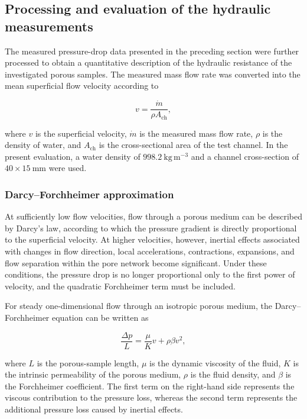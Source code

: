 \documentclass[a4paper]{article}
\begin{document}
\subsection{Processing and evaluation of the hydraulic measurements}
\label{sec:hydraulic_data_processing}

The measured pressure-drop data presented in the preceding section were further processed to obtain a quantitative description of the hydraulic resistance of the investigated porous samples. The measured mass flow rate was converted into the mean superficial flow velocity according to

\begin{equation}
    v = \frac{\dot{m}}{\rho A_{\mathrm{ch}}},
    \label{eq:superficial_velocity}
\end{equation}

where \(v\) is the superficial velocity, \(\dot{m}\) is the measured mass flow rate, \(\rho\) is the density of water, and \(A_{\mathrm{ch}}\) is the cross-sectional area of the test channel. In the present evaluation, a water density of \(998.2~\mathrm{kg\,m^{-3}}\) and a channel cross-section of \(40 \times 15~\mathrm{mm}\) were used.

\subsubsection{Darcy--Forchheimer approximation}
\label{subsec:darcy_forchheimer_approximation}

At sufficiently low flow velocities, flow through a porous medium can be described by Darcy's law, according to which the pressure gradient is directly proportional to the superficial velocity. At higher velocities, however, inertial effects associated with changes in flow direction, local accelerations, contractions, expansions, and flow separation within the pore network become significant. Under these conditions, the pressure drop is no longer proportional only to the first power of velocity, and the quadratic Forchheimer term must be included.

For steady one-dimensional flow through an isotropic porous medium, the Darcy--Forchheimer equation can be written as

\begin{equation}
    \frac{\Delta p}{L}
    =
    \frac{\mu}{K}v
    +
    \rho \beta v^2,
    \label{eq:darcy_forchheimer_gradient}
\end{equation}

where \(L\) is the porous-sample length, \(\mu\) is the dynamic viscosity of the fluid, \(K\) is the intrinsic permeability of the porous medium, \(\rho\) is the fluid density, and \(\beta\) is the Forchheimer coefficient. The first term on the right-hand side represents the viscous contribution to the pressure loss, whereas the second term represents the additional pressure loss caused by inertial effects.
\end{document}
